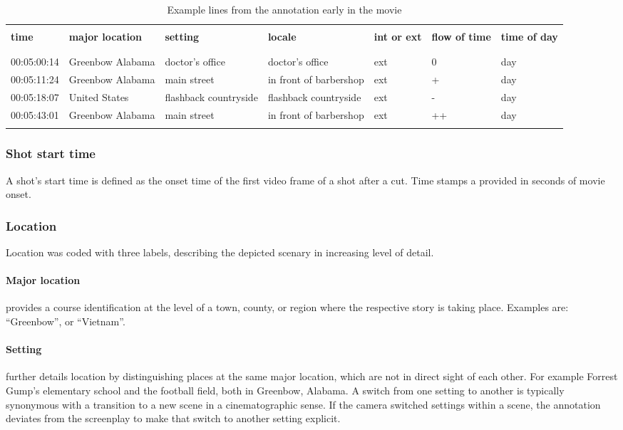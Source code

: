 \documentclass[10pt,a4paper,twocolumn]{article}
\begin{document}
\begin{table}
\caption{Example lines from the annotation early in the movie}
\label{tab:example}
\begin{tabular}{lllllll}
\hline\\ 
\textbf{time} & \textbf{major location} & \textbf{setting} & \textbf{locale} & \textbf{int or ext} & \textbf{flow of time} & \textbf{time of day}\\
\\\hline\\ 
00:05:00:14  & Greenbow Alabama  & doctor's office  & doctor's office  & ext  & 0 & day\tabularnewline
00:05:11:24  & Greenbow Alabama  & main street  & in front of barbershop  & ext  & + & day\tabularnewline
00:05:18:07  & United States  & flashback countryside  & flashback countryside  & ext  & - & day\tabularnewline
00:05:43:01 & Greenbow Alabama  & main street  & in front of barbershop  & ext  & ++ & day\tabularnewline
\\\hline 
\end{tabular}
\end{table}



\subsubsection*{Shot start time}

A shot's start time is defined as the onset time of the first video frame of a
shot after a cut. Time stamps a provided in seconds of movie onset. 

\subsubsection*{Location}

Location was coded with three labels, describing the depicted scenary
in increasing level of detail.

\paragraph{Major location} provides a course identification at the level of a
town, county, or region where the respective story is taking place. Examples are:
``Greenbow'', or ``Vietnam''.

\paragraph{Setting} further details location by distinguishing places at the same
major location, which are not in direct sight of each other. For example
Forrest Gump's elementary school and the football field, both in Greenbow,
Alabama. A switch from one setting to another is typically synonymous with a
transition to a new scene in a cinematographic sense. If the camera switched 
settings within a scene, the annotation deviates from the screenplay to make that
switch to another setting explicit.
\end{document}
